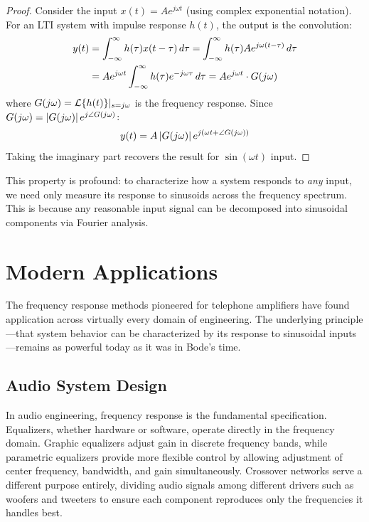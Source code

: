 \begin{proof}
Consider the input $x(t) = Ae^{j\omega t}$ (using complex exponential notation). For an LTI system with impulse response $h(t)$, the output is the convolution:
\begin{align}
y(t) &= \int_{-\infty}^{\infty} h(\tau) x(t-\tau) \, d\tau = \int_{-\infty}^{\infty} h(\tau) Ae^{j\omega(t-\tau)} \, d\tau \\
&= Ae^{j\omega t} \int_{-\infty}^{\infty} h(\tau) e^{-j\omega\tau} \, d\tau = Ae^{j\omega t} \cdot G(j\omega)
\end{align}
where $G(j\omega) = \mathcal{L}\{h(t)\}|_{s=j\omega}$ is the frequency response. Since $G(j\omega) = \left|G(j\omega)\right|e^{j\angle G(j\omega)}$:
\begin{equation}
y(t) = A\left|G(j\omega)\right| e^{j(\omega t + \angle G(j\omega))}
\end{equation}
Taking the imaginary part recovers the result for $\sin(\omega t)$ input.
\end{proof}

This property is profound: to characterize how a system responds to \textit{any} input, we need only measure its response to sinusoids across the frequency spectrum. This is because any reasonable input signal can be decomposed into sinusoidal components via Fourier analysis.

\section{Modern Applications}
\label{sec:modern_apps}

The frequency response methods pioneered for telephone amplifiers have found application across virtually every domain of engineering. The underlying principle---that system behavior can be characterized by its response to sinusoidal inputs---remains as powerful today as it was in Bode's time.

\subsection{Audio System Design}

In audio engineering, frequency response is the fundamental specification. Equalizers, whether hardware or software, operate directly in the frequency domain. Graphic equalizers adjust gain in discrete frequency bands, while parametric equalizers provide more flexible control by allowing adjustment of center frequency, bandwidth, and gain simultaneously. Crossover networks serve a different purpose entirely, dividing audio signals among different drivers such as woofers and tweeters to ensure each component reproduces only the frequencies it handles best.

